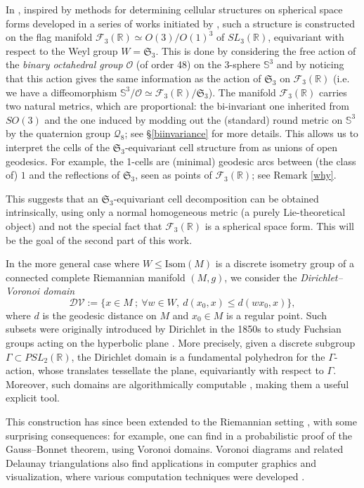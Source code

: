 \documentclass[11pt,twoside]{amsart}
\theoremstyle{plain}
\newcommand{\R}{{\mathbb R}}
\newcommand{\Sph}{\mathbb{S}}
\newcommand{\Sym}{\mathfrak{S}}
\begin{document}
In \cite{chirivi-garnier-spreafico}, inspired by methods for determining cellular structures on spherical space forms developed in a series of works initiated by \cite{mms13}, such a structure is constructed on the flag manifold $\mathcal{F}_3(\R)\simeq O(3)/O(1)^3$ of $SL_3(\R)$, equivariant with respect to the Weyl group $W=\Sym_3$. This is done by considering the free action of the \emph{binary octahedral group} $\mathcal{O}$ (of order 48) on the 3-sphere $\Sph^3$ and by noticing that this action gives the same information as the action of $\Sym_3$ on $\mathcal{F}_3(\R)$ (i.e. we have a diffeomorphism $\Sph^3/\mathcal{O}\simeq\mathcal{F}_3(\R)/\Sym_3$). The manifold $\mathcal{F}_3(\R)$ carries two natural metrics, which are proportional: the bi-invariant one inherited from $SO(3)$ and the one induced by modding out the (standard) round metric on $\Sph^3$ by the quaternion group $\mathcal{Q}_8$; see \S \ref{biinvariance} for more details. This allows us to interpret the cells of the $\Sym_3$-equivariant cell structure from \cite{chirivi-garnier-spreafico} as unions of open geodesics. For example, the 1-cells are (minimal) geodesic arcs between (the class of) $1$ and the reflections of $\Sym_3$, seen as points of $\mathcal{F}_3(\R)$; see Remark \ref{why}.

This suggests that an $\Sym_3$-equivariant cell decomposition can be obtained intrinsically, using only a normal homogeneous metric (a purely Lie-theoretical object) and not the special fact that $\mathcal{F}_3(\R)$ is a spherical space form. This will be the goal of the second part of this work.

In the more general case where $W\le\mathrm{Isom}(M)$ is a discrete isometry group of a connected complete Riemannian manifold $(M,g)$, we consider the \emph{Dirichlet--Voronoi domain}
\[\mathcal{DV}:=\{x\in M~;~\forall w\in W,~d(x_0,x)\le d(wx_0,x)\},\]
where $d$ is the geodesic distance on $M$ and $x_0\in M$ is a regular point. Such subsets were originally introduced by Dirichlet in the 1850s to study Fuchsian groups acting on the hyperbolic plane \cite{ratcliffe_hyperbolic}. More precisely, given a discrete subgroup $\Gamma\subset PSL_2(\R)$, the Dirichlet domain is a fundamental polyhedron for the $\Gamma$-action, whose translates tessellate the plane, equivariantly with respect to $\Gamma$. Moreover, such domains are algorithmically computable \cite{ratcliffe_hyperbolic,page_kleinian,voigt_fundomfuchs}, making them a useful explicit tool. 

This construction has since been extended to the Riemannian setting \cite{boissonnat-sharir-tagansky-yvinec,curved_voronoi_diagrams,boissonnat-rouxel-wintraecken}, with some surprising consequences: for example, one can find in \cite{chapron_phd} a probabilistic proof of the Gauss--Bonnet theorem, using Voronoi domains. Voronoi diagrams and related Delaunay triangulations also find applications in computer graphics and visualization, where various computation techniques were developed \cite{dyer-zhang-moller,NWTD}.
\end{document}
